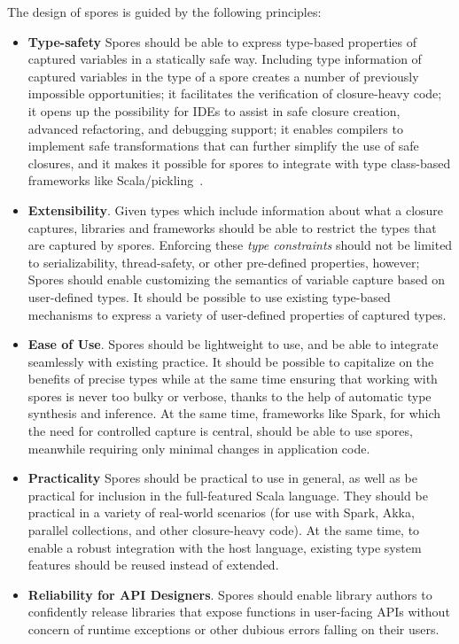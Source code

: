 \documentclass{llncs}
\begin{document}
The design of spores is guided by the following principles:
\vspace{-1.5mm}
\begin{itemize}
\item {\bf Type-safety} Spores should be able to express type-based
properties of captured variables in a statically safe way. Including type
information of captured variables in the type of a spore creates a number of
previously impossible opportunities; it facilitates the verification of
closure-heavy code; it opens up the possibility for IDEs to assist in safe
closure creation, advanced refactoring, and debugging support; it enables
compilers to implement safe transformations that can further simplify the use
of safe closures, and it makes it possible for spores to integrate with type
class-based frameworks like Scala/pickling~\cite{ScalaPickling}.

\item {\bf Extensibility}. Given types which include information about what  a
closure captures, libraries and frameworks should be able to restrict the
types that are captured by spores. Enforcing these {\em type constraints}
should not be limited to serializability, thread-safety, or other pre-defined
properties, however; Spores should enable customizing the semantics of
variable capture based on user-defined types. It should be possible to use
existing type-based mechanisms to express a variety of user-defined properties
of captured types.

\item {\bf Ease of Use}. Spores should be lightweight
to use, and be able to integrate seamlessly with existing practice. It should
be possible to capitalize on the benefits of precise types while at the same
time ensuring that working with spores is never too bulky or verbose, thanks
to the help of automatic type synthesis and inference. At the same time,
frameworks like Spark, for which the need for controlled capture is central,
should be able to use spores, meanwhile requiring only minimal changes in
application code.

\item {\bf Practicality} Spores should be practical to use in general, as
well as be practical for inclusion in the full-featured Scala language. They
should be practical in a variety of real-world scenarios (for use with Spark,
Akka, parallel collections, and other closure-heavy code). At the same time,
to enable a robust integration with the host language, existing type system
features should be reused instead of extended.

\item {\bf Reliability for API Designers}. Spores should enable library
authors to confidently release libraries that expose functions in user-facing
APIs without concern of runtime exceptions or other dubious errors falling on
their users.

\end{itemize}
\end{document}
